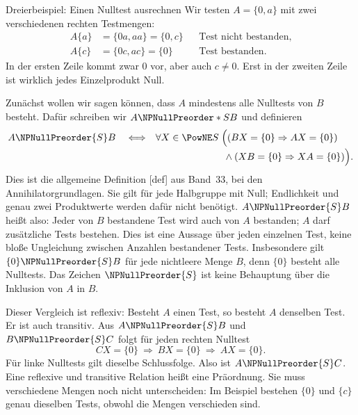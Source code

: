 \begin{NPReadingExample}{Dreierbeispiel: Einen Nulltest ausrechnen}
Wir testen \(A=\{0,a\}\) mit zwei verschiedenen rechten Testmengen:
\[
 \begin{aligned}
 A\{a\}&=\{0a,aa\}=\{0,c\}&&\text{Test nicht bestanden},\\
 A\{c\}&=\{0c,ac\}=\{0\}&&\text{Test bestanden}.
 \end{aligned}
\]
In der ersten Zeile kommt zwar \(0\) vor, aber auch \(c\ne0\).
Erst in der zweiten Zeile ist wirklich jedes Einzelprodukt Null.
\end{NPReadingExample}

Zunächst wollen wir sagen können, dass \(A\) mindestens alle Nulltests
von \(B\) besteht. Dafür schreiben wir \(A\NPNullPreorder*{S} B\) und definieren
\[
 \begin{aligned}
 A\NPNullPreorder{S} B\quad\Longleftrightarrow\quad
 &\forall X\in\PowNE S\;\Bigl(
 (BX=\{0\}\Rightarrow AX=\{0\})\\[-2pt]
 &\hspace{7em}\land(XB=\{0\}\Rightarrow XA=\{0\})\Bigr).
 \end{aligned}
\]
Dies ist die allgemeine Definition
[def] aus Band~33, bei den
Annihilatorgrundlagen. Sie gilt für jede Halbgruppe mit Null;
Endlichkeit und genau zwei Produktwerte werden dafür nicht benötigt.
\(A\NPNullPreorder{S} B\) heißt also: Jeder von \(B\) bestandene Test wird
auch von \(A\) bestanden; \(A\) darf zusätzliche Tests bestehen.
Dies ist eine Aussage über jeden einzelnen Test, keine bloße
Ungleichung zwischen Anzahlen bestandener Tests.
Insbesondere gilt \(\{0\}\NPNullPreorder{S} B\) für
jede nichtleere Menge \(B\), denn \(\{0\}\) besteht alle Nulltests.
Das Zeichen \(\NPNullPreorder{S}\) ist keine Behauptung über die Inklusion
von \(A\) in \(B\).

Dieser Vergleich ist reflexiv: Besteht \(A\) einen Test, so besteht
\(A\) denselben Test. Er ist auch transitiv. Aus \(A\NPNullPreorder{S} B\)
und \(B\NPNullPreorder{S} C\) folgt für jeden rechten Nulltest
\[
 CX=\{0\}\ \Longrightarrow\ BX=\{0\}\ \Longrightarrow\ AX=\{0\}.
\]
Für linke Nulltests gilt dieselbe Schlussfolge. Also ist
\(A\NPNullPreorder{S} C\). Eine reflexive und transitive Relation heißt eine
Präordnung. Sie muss verschiedene Mengen noch nicht unterscheiden:
Im Beispiel bestehen \(\{0\}\) und \(\{c\}\) genau dieselben Tests,
obwohl die Mengen verschieden sind.

